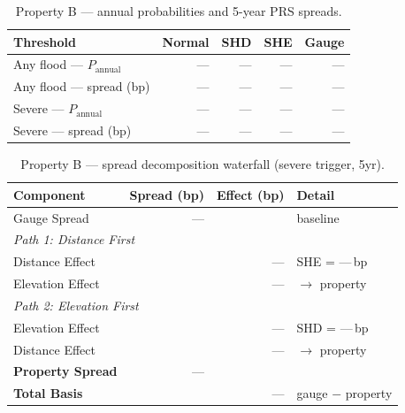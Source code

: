 \documentclass[11pt,a4paper]{article}
\begin{document}
\begin{table}[H]
    \centering
    \caption{Property B --- annual probabilities and 5-year PRS spreads.}
    \begin{tabular}{lrrrr}
        \toprule
        \textbf{Threshold} & \textbf{Normal} & \textbf{SHD} & \textbf{SHE} & \textbf{Gauge} \\
        \midrule
        Any flood --- $P_{\text{annual}}$  & --- & --- & --- & --- \\
        Any flood --- spread (bp)          & --- & --- & --- & --- \\
        Severe --- $P_{\text{annual}}$     & --- & --- & --- & --- \\
        Severe --- spread (bp)             & --- & --- & --- & --- \\
        \bottomrule
    \end{tabular}
\end{table}

\begin{table}[H]
    \centering
    \caption{Property B --- spread decomposition waterfall (severe trigger, 5yr).}
    \begin{tabular}{lrrl}
        \toprule
        \textbf{Component} & \textbf{Spread (bp)} & \textbf{Effect (bp)} & \textbf{Detail} \\
        \midrule
        Gauge Spread                  & --- &        & baseline \\
        \multicolumn{4}{l}{\textit{Path 1: Distance First}} \\
        \quad Distance Effect         &     & ---    & SHE = ---\,bp \\
        \quad Elevation Effect        &     & ---    & $\rightarrow$ property \\
        \multicolumn{4}{l}{\textit{Path 2: Elevation First}} \\
        \quad Elevation Effect        &     & ---    & SHD = ---\,bp \\
        \quad Distance Effect         &     & ---    & $\rightarrow$ property \\
        \midrule
        \textbf{Property Spread}      & --- &        & \\
        \textbf{Total Basis}          &     & ---    & gauge $-$ property \\
        \bottomrule
    \end{tabular}
\end{table}


\end{document}
